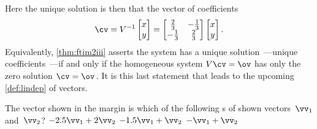 \begin{example}
\begin{solution}
Here the unique solution is then that the vector of coefficients
\begin{equation*}
\cv=V^{-1}\begin{bmatrix} x\\y \end{bmatrix}
=\begin{bmatrix} \frac23&-\frac13\\-\frac13&\frac23 \end{bmatrix}
\begin{bmatrix} x\\y \end{bmatrix}.
\end{equation*}
Equivalently, \cref{thm:ftim2iii} asserts the system has a unique solution~\cv---unique coefficients~\cv---if and only if the {homogeneous} system \(V\cv=\ov\) has only the zero solution \(\cv=\ov\)\,.
It is this last statement that leads to the upcoming \cref{def:lindep} of  vectors.
\end{solution}
\end{example}



\begin{activity}
The vector shown in the margin is which of the following s of shown vectors~\(\vv_1\) and~\(\vv_2\)?
{\(-2.5\vv_1 +2\vv_2\)}
{\(-1.5\vv_1 +\vv_2\)}
{\(-\vv_1 +\vv_2\)}
\end{activity}








